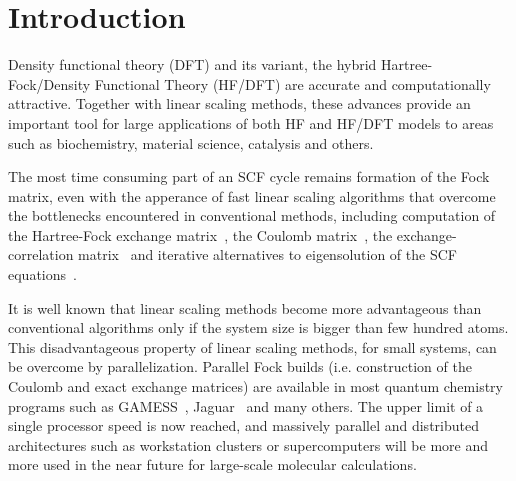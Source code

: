 \documentclass[prl,twocolumn,twocolumngrid,superbib]{revtex4}
\begin{document}
\section{Introduction}

 Density functional theory (DFT) and its variant, 
 the hybrid Hartree-Fock/Density Functional Theory (HF/DFT) are accurate and
 computationally attractive. Together with linear scaling methods, these
 advances provide an important tool for large applications
 of both HF and HF/DFT models to areas such as biochemistry, 
 material science, catalysis and others.


 The most time consuming part of an SCF cycle remains formation
 of the Fock matrix, even with the apperance of fast linear
 scaling algorithms 
 that overcome the bottlenecks encountered in conventional methods,
 including computation of the Hartree-Fock exchange 
 matrix~\cite{ESchwegler96,ESchwegler97,ESchwegler98A,ESchwegler99,ESchwegler00,CTymczak04b},
 the Coulomb 
 matrix~\cite{CWhite94B,CWhite96A,MChallacombe96,MChallacombe96B,MStrain96,
              JPerezjorda97,MChallacombe97,CTymczak04a}, 
 the exchange-correlation 
 matrix~\cite{CTymczak04a,Jorda95,RStratmann96,CGuerra98,MChallacombe00A}
 and iterative alternatives to eigensolution of the SCF 
 equations~\cite{XLi93,MDaw93,ADaniels97,APalser98,
                 MChallacombe99,ANiklasson02A,ANiklasson03}.

 It is well known that linear scaling 
 methods become more advantageous than conventional  
 algorithms only if the system size is bigger than
 few hundred atoms. This disadvantageous property of linear
 scaling methods, for small systems, can be overcome by 
 parallelization. 
 Parallel Fock builds (i.e. construction of the Coulomb and exact exchange matrices)
 are available in most quantum
 chemistry programs such as GAMESS~\cite{GAMESS},
 Jaguar~\cite{DChasman98} and many others. 
 The upper limit of a single processor speed
 is now reached, and massively parallel and distributed
 architectures such as workstation clusters or supercomputers will be 
 more and more used in the near future for large-scale 
 molecular calculations.
\end{document}
